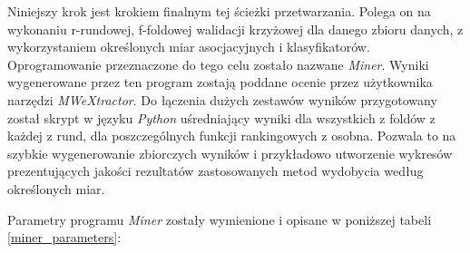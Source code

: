 \documentclass[11pt,a4paper]{llncs}
\begin{document}
Niniejszy krok jest krokiem finalnym tej ścieżki przetwarzania.
Polega on na wykonaniu r-rundowej, f-foldowej walidacji krzyżowej dla danego zbioru danych, z wykorzystaniem określonych miar asocjacyjnych i klasyfikatorów.
Oprogramowanie przeznaczone do tego celu zostało nazwane \emph{Miner}.
Wyniki wygenerowane przez ten program zostają poddane ocenie przez użytkownika narzędzi \emph{MWeXtractor}. 
Do łączenia dużych zestawów wyników przygotowany został skrypt w języku \emph{Python} uśredniający wyniki dla wszystkich z foldów z każdej z rund, dla poszczególnych funkcji rankingowych z osobna.
Pozwala to na szybkie wygenerowanie zbiorczych wyników i przykładowo utworzenie wykresów prezentujących jakości rezultatów zastosowanych metod wydobycia według określonych miar.
\par
Parametry programu \emph{Miner} zostały wymienione i opisane w poniższej tabeli \ref{miner_parameters}:
\end{document}
